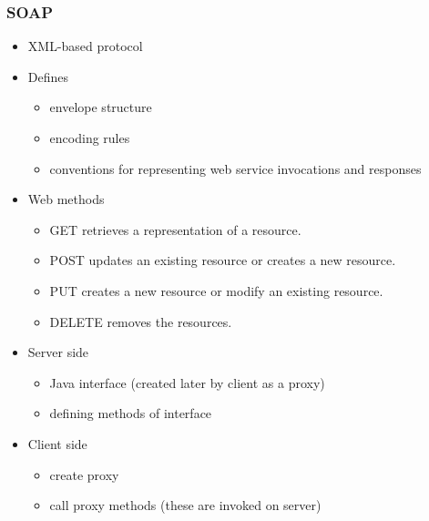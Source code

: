 \documentclass[10pt,xcolor=pdflatex]{beamer}
\begin{document}
\begin{frame}[containsverbatim]\frametitle{SOAP}
\begin{itemize}
	\item XML-based protocol
	\item Defines
      \begin{itemize}
    	\item envelope structure
		\item encoding rules
		\item conventions for representing web service invocations and responses
      \end{itemize}
    \item Web methods
      \begin{itemize}
        \item GET retrieves a representation of a resource.
        \item POST updates an existing resource or creates a new resource.
        \item PUT creates a new resource or modify an existing resource.
        \item DELETE removes the resources.
      \end{itemize}
    \item Server side
      \begin{itemize}
    	\item Java interface (created later by client as a proxy)
        \item defining methods of interface
      \end{itemize}
    \item Client side
      \begin{itemize}
    	\item create proxy
		\item call proxy methods (these are invoked on server)
      \end{itemize}
\end{itemize}
\end{frame}
\end{document}
